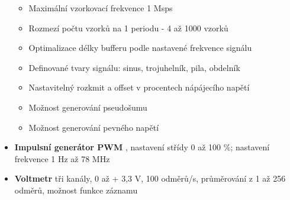 \begin{itemize}
	\begin{itemize}
		\item Maximální vzorkovací frekvence 1 Msps
		\item Rozmezí počtu vzorků na 1 periodu - 4 až 1000 vzorků
		\item Optimalizace délky bufferu podle nastavené frekvence signálu
		\item Definované tvary signálu: sinus, trojuhelník, pila, obdelník
		\item Nastavitelný rozkmit a offset v procentech nápájecího napětí
		\item Možnost generování pseudošumu
		\item Možnost generování pevného napětí		
	\end{itemize}
	
	\item \textbf{Impulsní generátor PWM} , nastavení  střídy 0 až 100 \%; nastavení frekvence 1 Hz až 78 MHz
	\item \textbf{Voltmetr} tři kanály, 0 až + 3,3 V, 100 odměrů/s, průměrování z 1 až 256 odměrů, možnost funkce záznamu
\end{itemize}
